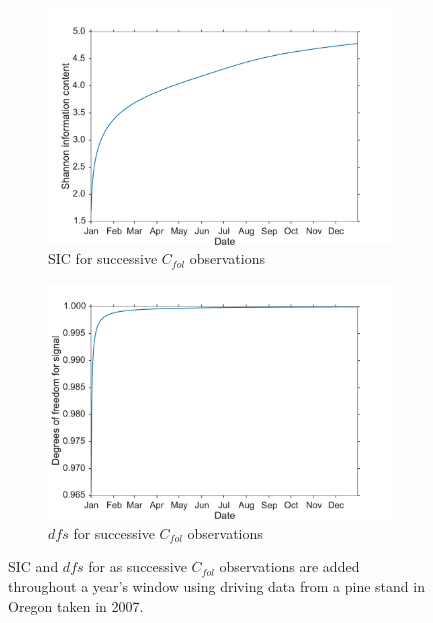 \documentclass[11pt]{article}
\begin{document}
\begin{figure}[ht]
    \centering
    \begin{subfigure}[b]{0.45\textwidth}
        \includegraphics[width=\textwidth]{sic_succ_cf.pdf}
        \caption{SIC for successive \(C_{fol}\) observations}
        \label{fig:sic_succ_cf}
    \end{subfigure}%
    \begin{subfigure}[b]{0.45\textwidth}
        \includegraphics[width=\textwidth]{dfs_succ_cf.pdf}
        \caption{\(dfs\) for successive \(C_{fol}\) observations}
        \label{fig:dfs_succ_cf}
    \end{subfigure}
    \caption{SIC and \(dfs\) for as successive \(C_{fol}\) observations are added throughout a year's window using driving data from a pine stand in Oregon taken in 2007.}
    \label{fig:ic_succ_cf}
\end{figure}
\end{document}
